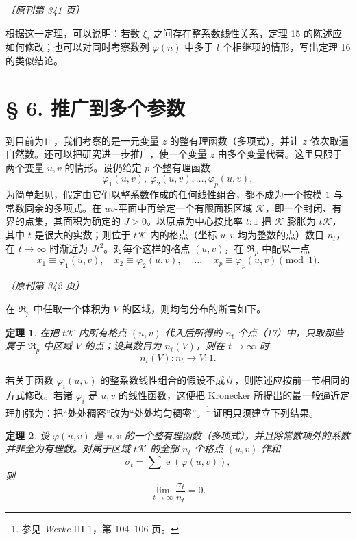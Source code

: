 \documentclass[UTF8,11pt,a4paper,fontset=none]{ctexart}
\theoremstyle{weylthm}
\newtheorem{theorem}{定理}
\newcommand{\e}{\operatorname{e}}
\newcommand{\origpage}[1]{%
  \par\vspace{0.7em}\noindent\hfill{\small\itshape〔原刊第 #1 页〕}\par\vspace{0.25em}}
\begin{document}
\origpage{341}

根据这一定理，可以说明：若数 \(\xi_i\) 之间存在整系数线性关系，定理 15 的陈述应如何修改；也可以对同时考察数列
\(\varphi(n)\) 中多于 \(l\) 个相继项的情形，写出定理 16 的类似结论。

\section*{§ 6. 推广到多个参数}

到目前为止，我们考察的是一元变量 \(z\) 的整有理函数（多项式），并让
\(z\) 依次取遍自然数。还可以把研究进一步推广，使一个变量 \(z\) 由多个变量代替。这里只限于两个变量
\(u,v\) 的情形。设仍给定 \(p\) 个整有理函数
\[
  \varphi_1(u,v),\ \varphi_2(u,v),\ldots,\varphi_p(u,v),
\]
为简单起见，假定由它们以整系数作成的任何线性组合，都不成为一个按模
\(1\) 与常数同余的多项式。在 \(uv\)-平面中再给定一个有限面积区域
\(\mathcal K\)，即一个封闭、有界的点集，其面积为确定的
\(J>0\)。以原点为中心按比率 \(t:1\) 把 \(\mathcal K\) 膨胀为
\(t\mathcal K\)，其中 \(t\) 是很大的实数；则位于
\(t\mathcal K\) 内的格点（坐标 \(u,v\) 均为整数的点）数目
\(n_t\)，在 \(t\to\infty\) 时渐近为 \(Jt^2\)。对每个这样的格点
\((u,v)\)，在 \(\mathfrak R_p\) 中配以一点
\begin{equation}
  x_1\equiv\varphi_1(u,v),\quad
  x_2\equiv\varphi_2(u,v),\quad\ldots,\quad
  x_p\equiv\varphi_p(u,v)\pmod 1.
  \tag{17}
\end{equation}

\origpage{342}

在 \(\mathfrak R_p\) 中任取一个体积为 \(V\) 的区域，则均匀分布的断言如下。

\begin{theorem}
在把 \(t\mathcal K\) 内所有格点 \((u,v)\) 代入后所得的
\(n_t\) 个点（17）中，只取那些属于 \(\mathfrak R_p\) 中区域
\(V\) 的点；设其数目为 \(n_t(V)\)，则在 \(t\to\infty\) 时
\[
  n_t(V):n_t\longrightarrow V:1.
\]
\end{theorem}

若关于函数 \(\varphi_i(u,v)\) 的整系数线性组合的假设不成立，则陈述应按前一节相同的方式修改。若诸
\(\varphi_i\) 是 \(u,v\) 的线性函数，这便把 Kronecker 所提出的最一般逼近定理加强为：把“处处稠密”改为“处处均匀稠密”。\footnote{参见 \emph{Werke} III 1，第 104--106 页。} 证明只须建立下列结果。

\begin{theorem}
设 \(\varphi(u,v)\) 是 \(u,v\) 的一个整有理函数（多项式），并且除常数项外的系数并非全为有理数。对属于区域
\(t\mathcal K\) 的全部 \(n_t\) 个格点 \((u,v)\) 作和
\[
  \sigma_t=\sum\e(\varphi(u,v)),
\]
则
\[
  \lim_{t\to\infty}\frac{\sigma_t}{n_t}=0.
\]
\end{theorem}
\end{document}
